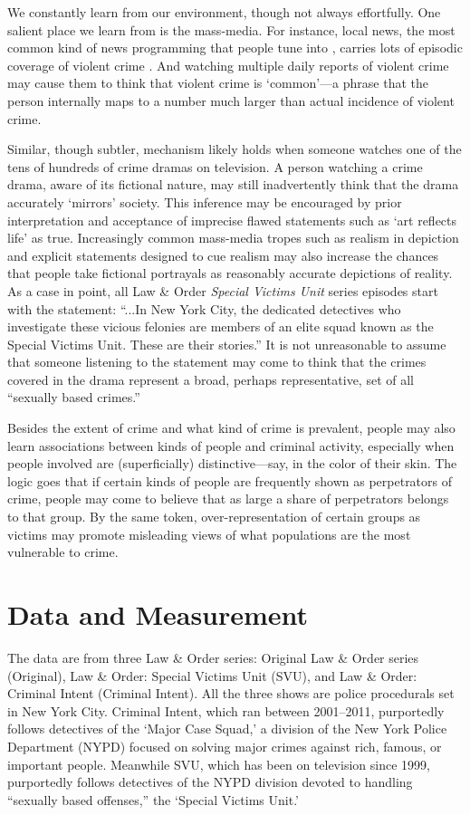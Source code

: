 \documentclass[12pt, letterpaper]{article}
\begin{document}
We constantly learn from our environment, though not always effortfully. One salient place we learn from is the mass-media. For instance, local news, the most common kind of news programming that people tune into \citep{pew2004}, carries lots of episodic coverage of violent crime \citep[see, for instance,][]{gross2006covering, klite1997local}. And watching multiple daily reports of violent crime may cause them to think that violent crime is `common'---a phrase that the person internally maps to a number much larger than actual incidence of violent crime.

Similar, though subtler, mechanism likely holds when someone watches one of the tens of hundreds of crime dramas on television. A person watching a crime drama, aware of its fictional nature, may still inadvertently think that the drama accurately `mirrors' society. This inference may be encouraged by prior interpretation and acceptance of imprecise flawed statements such as `art reflects life' as true. Increasingly common mass-media tropes such as realism in depiction and explicit statements designed to cue realism may also increase the chances that people take fictional portrayals as reasonably accurate depictions of reality. As a case in point, all Law \& Order \textit{Special Victims Unit} series episodes start with the statement: ``...In New York City, the dedicated detectives who investigate these vicious felonies are members of an elite squad known as the Special Victims Unit. These are their stories.'' It is not unreasonable to assume that someone listening to the statement may come to think that the crimes covered in the drama represent a broad, perhaps representative, set of all ``sexually based crimes.''

Besides the extent of crime and what kind of crime is prevalent, people may also learn associations between kinds of people and criminal activity, especially when people involved are (superficially) distinctive---say, in the color of their skin. The logic goes that if certain kinds of people are frequently shown as perpetrators of crime, people may come to believe that as large a share of perpetrators belongs to that group. By the same token, over-representation of certain groups as victims may promote misleading views of what populations are the most vulnerable to crime.

\section*{Data and Measurement}
The data are from three Law \& Order series: Original Law \& Order series (Original), Law \& Order: Special Victims Unit (SVU), and Law \& Order: Criminal Intent (Criminal Intent). All the three shows are police procedurals set in New York City. Criminal Intent, which ran between 2001--2011, purportedly follows detectives of the `Major Case Squad,' a division of the New York Police Department (NYPD) focused on solving major crimes against rich, famous, or important people. Meanwhile SVU, which has been on television since 1999, purportedly follows detectives of the NYPD division devoted to handling ``sexually based offenses,'' the `Special Victims Unit.'
\end{document}
